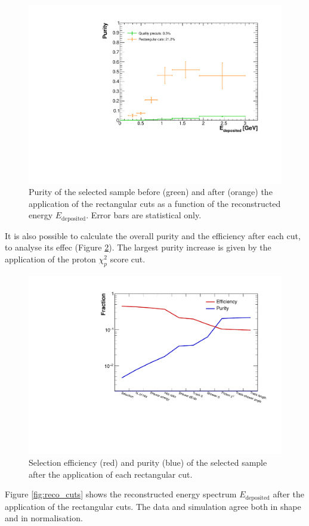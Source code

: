 \begin{figure}[htbp]
\centering
  \includegraphics[width=0.75\linewidth]{figures/purity_sel.pdf}
  \caption{Purity of the selected sample before (green) and after (orange) the application of the rectangular cuts as a function of the reconstructed energy $E_{\mathrm{deposited}}$. Error bars are statistical only.}\label{fig:purity_sel}
\end{figure}

It is also possible to calculate the overall purity and the efficiency after each cut, to analyse its effec (Figure \ref{fig:effpurity_cuts}). The largest purity increase is given by the application of the proton $\chi_{p}^2$ score cut. 

\begin{figure}[htbp]
\centering
  \includegraphics[width=0.75\linewidth]{figures/purity_eff.pdf}
  \caption{Selection efficiency (red) and purity (blue) of the selected sample after the application of each rectangular cut.}\label{fig:effpurity_cuts}
\end{figure}

Figure \ref{fig:reco_cuts} shows the reconstructed energy spectrum $E_{\mathrm{deposited}}$ after the application of the rectangular cuts. The data and simulation agree both in shape and in normalisation.

